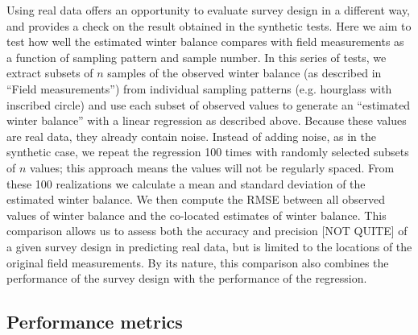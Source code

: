 \documentclass[twocolumn,letterpaper]{igs}
\begin{document}
 Using real data offers an opportunity to evaluate survey design in a different way, and provides a check on the result obtained in the synthetic tests. Here we aim to test how well the estimated winter balance compares with field measurements as a function of sampling pattern and sample number. In this series of tests, we extract subsets of $n$ samples of the observed winter balance (as described in ``Field measurements'') from individual sampling patterns (e.g. hourglass with inscribed circle) and use each subset of observed values to generate an ``estimated winter balance'' with a linear regression as described above. Because these values are real data, they already contain noise. Instead of adding noise, as in the synthetic case, we repeat the regression 100 times with randomly selected subsets of $n$ values; this approach means the values will not be regularly spaced. From these 100 realizations we calculate a mean and standard deviation of the estimated winter balance. We then compute the RMSE between all observed values of winter balance and the co-located estimates of winter balance. This comparison allows us to assess both the accuracy and precision [NOT QUITE] of a given survey design in predicting real data, but is limited to the locations of the original field measurements. By its nature, this comparison also combines the performance of the survey design with the performance of the regression. 

 \subsection{Performance metrics}
 
\end{document}
